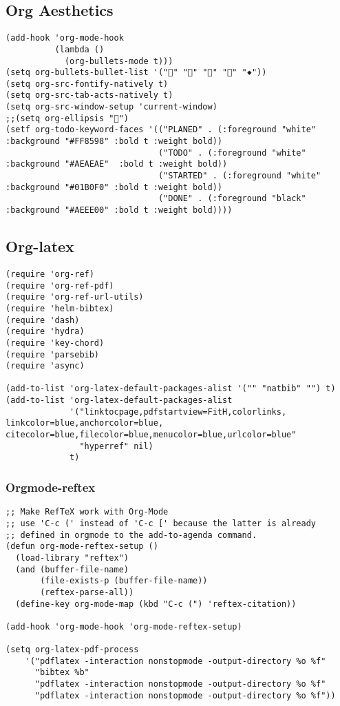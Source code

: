 \documentclass[11pt]{article}
\begin{document}
\subsection{Org Aesthetics}
\label{sec:orgheadline40}
\begin{verbatim}
(add-hook 'org-mode-hook
          (lambda ()
            (org-bullets-mode t)))
(setq org-bullets-bullet-list '("" "" "" "" "✸"))
(setq org-src-fontify-natively t)
(setq org-src-tab-acts-natively t)
(setq org-src-window-setup 'current-window)
;;(setq org-ellipsis "")
(setf org-todo-keyword-faces '(("PLANED" . (:foreground "white" :background "#FF8598" :bold t :weight bold))
                               ("TODO" . (:foreground "white" :background "#AEAEAE"  :bold t :weight bold))
                               ("STARTED" . (:foreground "white" :background "#01B0F0" :bold t :weight bold))
                               ("DONE" . (:foreground "black" :background "#AEEE00" :bold t :weight bold))))
\end{verbatim}
\subsection{Org-latex}
\label{sec:orgheadline42}
\begin{verbatim}
(require 'org-ref)
(require 'org-ref-pdf)
(require 'org-ref-url-utils)
(require 'helm-bibtex)
(require 'dash)
(require 'hydra)
(require 'key-chord)
(require 'parsebib)
(require 'async)

(add-to-list 'org-latex-default-packages-alist '("" "natbib" "") t)
(add-to-list 'org-latex-default-packages-alist
             '("linktocpage,pdfstartview=FitH,colorlinks,
linkcolor=blue,anchorcolor=blue,
citecolor=blue,filecolor=blue,menucolor=blue,urlcolor=blue"
               "hyperref" nil)
             t)
\end{verbatim}
\subsubsection{Orgmode-reftex}
\label{sec:orgheadline41}
\begin{verbatim}
;; Make RefTeX work with Org-Mode
;; use 'C-c (' instead of 'C-c [' because the latter is already
;; defined in orgmode to the add-to-agenda command.
(defun org-mode-reftex-setup ()
  (load-library "reftex")
  (and (buffer-file-name)
       (file-exists-p (buffer-file-name))
       (reftex-parse-all))
  (define-key org-mode-map (kbd "C-c (") 'reftex-citation))

(add-hook 'org-mode-hook 'org-mode-reftex-setup)

(setq org-latex-pdf-process
    '("pdflatex -interaction nonstopmode -output-directory %o %f"
      "bibtex %b"
      "pdflatex -interaction nonstopmode -output-directory %o %f"
      "pdflatex -interaction nonstopmode -output-directory %o %f"))
\end{verbatim}
\end{document}
